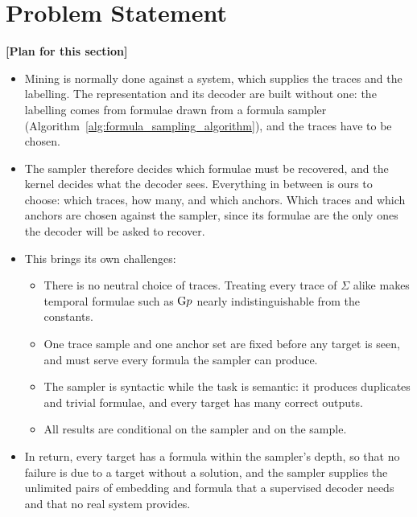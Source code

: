 \documentclass[titlepage,a4paper,11pt]{report}
\newenvironment{RSplan}{\par\medskip\color{orange!85!black}\noindent\textbf{[Plan for this section]}\par}{\par\medskip}
\begin{document}
    \section{Problem Statement}\label{sec:intro_no_system}
    \begin{RSplan}
    \begin{itemize}
        \item Mining is normally done against a system, which supplies the traces and the labelling. The representation and its decoder are built without one: the labelling comes from formulae drawn from a formula sampler (Algorithm~\ref{alg:formula_sampling_algorithm}), and the traces have to be chosen.
        \item The sampler therefore decides which formulae must be recovered, and the kernel decides what the decoder sees. Everything in between is ours to choose: which traces, how many, and which anchors. Which traces and which anchors are chosen against the sampler, since its formulae are the only ones the decoder will be asked to recover.
        \item This brings its own challenges:
        \begin{itemize}
            \item There is no neutral choice of traces. Treating every trace of $\Sigma$ alike makes temporal formulae such as $\text{G} p$ nearly indistinguishable from the constants.
            \item One trace sample and one anchor set are fixed before any target is seen, and must serve every formula the sampler can produce.
            \item The sampler is syntactic while the task is semantic: it produces duplicates and trivial formulae, and every target has many correct outputs.
            \item All results are conditional on the sampler and on the sample.
        \end{itemize}
        \item In return, every target has a formula within the sampler's depth, so that no failure is due to a target without a solution, and the sampler supplies the unlimited pairs of embedding and formula that a supervised decoder needs and that no real system provides.
    \end{itemize}
    \end{RSplan}
\end{document}
